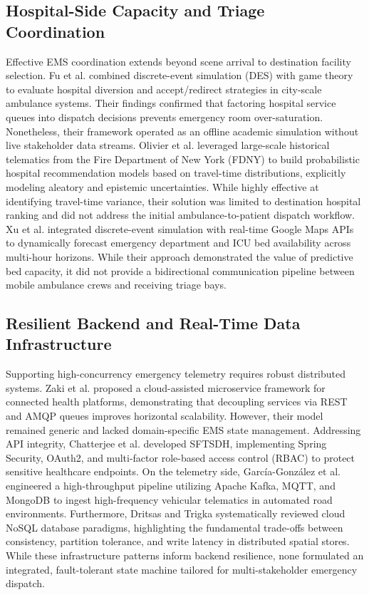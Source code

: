 \documentclass[conference]{IEEEtran}
\begin{document}
\subsection{Hospital-Side Capacity and Triage Coordination}
Effective EMS coordination extends beyond scene arrival to destination facility selection. Fu et al. \cite{fu2022modelling} combined discrete-event simulation (DES) with game theory to evaluate hospital diversion and accept/redirect strategies in city-scale ambulance systems. Their findings confirmed that factoring hospital service queues into dispatch decisions prevents emergency room over-saturation. Nonetheless, their framework operated as an offline academic simulation without live stakeholder data streams. Olivier et al. \cite{olivier2022data} leveraged large-scale historical telematics from the Fire Department of New York (FDNY) to build probabilistic hospital recommendation models based on travel-time distributions, explicitly modeling aleatory and epistemic uncertainties. While highly effective at identifying travel-time variance, their solution was limited to destination hospital ranking and did not address the initial ambulance-to-patient dispatch workflow. Xu et al. \cite{xu2024emergency} integrated discrete-event simulation with real-time Google Maps APIs to dynamically forecast emergency department and ICU bed availability across multi-hour horizons. While their approach demonstrated the value of predictive bed capacity, it did not provide a bidirectional communication pipeline between mobile ambulance crews and receiving triage bays.

\subsection{Resilient Backend and Real-Time Data Infrastructure}
Supporting high-concurrency emergency telemetry requires robust distributed systems. Zaki et al. \cite{zaki2022introducing} proposed a cloud-assisted microservice framework for connected health platforms, demonstrating that decoupling services via REST and AMQP queues improves horizontal scalability. However, their model remained generic and lacked domain-specific EMS state management. Addressing API integrity, Chatterjee et al. \cite{chatterjee2022sftsdh} developed SFTSDH, implementing Spring Security, OAuth2, and multi-factor role-based access control (RBAC) to protect sensitive healthcare endpoints. On the telemetry side, García-González et al. \cite{garcia2025big} engineered a high-throughput pipeline utilizing Apache Kafka, MQTT, and MongoDB to ingest high-frequency vehicular telematics in automated road environments. Furthermore, Dritsas and Trigka \cite{dritsas2025database} systematically reviewed cloud NoSQL database paradigms, highlighting the fundamental trade-offs between consistency, partition tolerance, and write latency in distributed spatial stores. While these infrastructure patterns inform backend resilience, none formulated an integrated, fault-tolerant state machine tailored for multi-stakeholder emergency dispatch.
\end{document}
